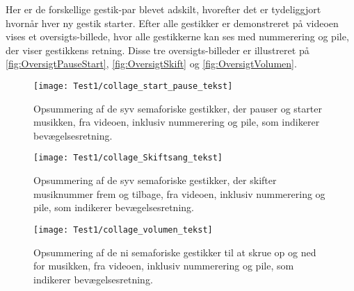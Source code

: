 Her er de forskellige gestik-par blevet adskilt, hvorefter det er tydeliggjort hvornår hver ny gestik starter. Efter alle gestikker er demonstreret på videoen vises et oversigts-billede, hvor alle gestikkerne kan ses med nummerering og pile, der viser gestikkens retning. Disse tre oversigts-billeder er illustreret på \autoref{fig:OversigtPauseStart}, \autoref{fig:OversigtSkift} og \autoref{fig:OversigtVolumen}.
%
\begin{figure}[H]
	\centering
	\texttt{[image: Test1/collage\_start\_pause\_tekst]}
	\caption{Opsummering af de syv semaforiske gestikker, der pauser og starter musikken, fra videoen, inklusiv nummerering og pile, som indikerer bevægelsesretning.}
	\label{fig:OversigtPauseStart}
\end{figure}
\noindent
%
%
\begin{figure}[H]
	\centering
	\texttt{[image: Test1/collage\_Skiftsang\_tekst]}
	\caption{Opsummering af de syv semaforiske gestikker, der skifter musiknummer frem og tilbage, fra videoen, inklusiv nummerering og pile, som indikerer bevægelsesretning.}
	\label{fig:OversigtSkift}
\end{figure}
\noindent
%
%
\begin{figure}[H]
	\centering
	\texttt{[image: Test1/collage\_volumen\_tekst]}
	\caption{Opsummering af de ni semaforiske gestikker til at skrue op og ned for musikken, fra videoen, inklusiv nummerering og pile, som indikerer bevægelsesretning.}
	\label{fig:OversigtVolumen}
\end{figure}
\noindent
%

